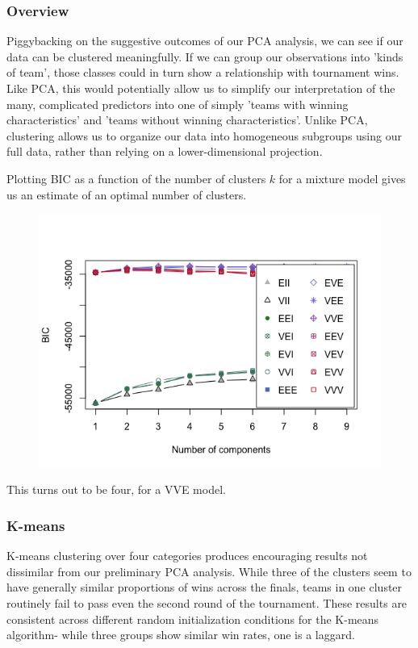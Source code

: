 \documentclass[10pt,a4paper, hidelinks]{article} %
\begin{document}
\subsubsection{Overview}
Piggybacking on the suggestive outcomes of our PCA analysis, we can see if our data can be clustered meaningfully.  If we can group our observations into 'kinds of team', those classes could in turn show a relationship with tournament wins.  Like PCA, this would potentially allow us to simplify our interpretation of the many, complicated predictors into one of simply 'teams with winning characteristics' and 'teams without winning characteristics'.  Unlike PCA, clustering allows us to organize our data into homogeneous subgroups using our full data, rather than relying on a lower-dimensional projection.

Plotting BIC as a function of the number of clusters $k$ for a mixture model gives us an estimate of an optimal number of clusters.

\begin{figure}[H]
	\centering
	\includegraphics[width=0.7\linewidth]{../fig/sonofaBIC}
\end{figure}

This turns out to be four, for a VVE model.

\subsubsection{K-means}


K-means clustering over four categories produces encouraging results not dissimilar from our preliminary PCA analysis.  While three of the clusters seem to have generally similar proportions of wins across the finals, teams in one cluster routinely fail to pass even the second round of the tournament.  These results are consistent across different random initialization conditions for the K-means algorithm- while three groups show similar win rates, one is a laggard.
\end{document}
